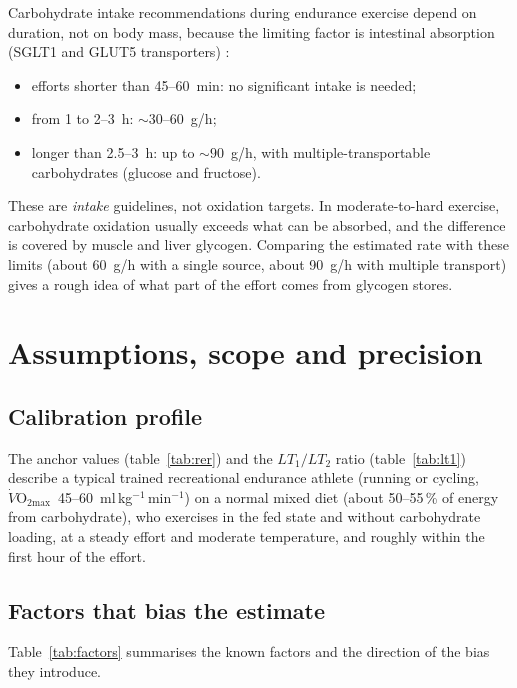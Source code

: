 \documentclass[10pt,a4paper]{article}
\newcommand{\VOmax}{\ensuremath{\dot V\mathrm{O_{2max}}}}
\newcommand{\mlkgmin}{ml\,kg$^{-1}$\,min$^{-1}$}
\begin{document}
Carbohydrate intake recommendations during endurance exercise depend on duration, not on
body mass, because the limiting factor is intestinal absorption (SGLT1 and GLUT5
transporters) \citep{jeukendrup2014}:
\begin{itemize}
  \item efforts shorter than 45--60~min: no significant intake is needed;
  \item from 1 to 2--3~h: $\sim30$--60~g/h;
  \item longer than 2.5--3~h: up to $\sim90$~g/h, with multiple-transportable
        carbohydrates (glucose and fructose).
\end{itemize}
These are \emph{intake} guidelines, not oxidation targets. In moderate-to-hard exercise,
carbohydrate oxidation usually exceeds what can be absorbed, and the difference is covered
by muscle and liver glycogen. Comparing the estimated rate with these limits (about 60~g/h
with a single source, about 90~g/h with multiple transport) gives a rough idea of what part
of the effort comes from glycogen stores.

\section{Assumptions, scope and precision}\label{sec:suposits}

\subsection{Calibration profile}
The anchor values (table~\ref{tab:rer}) and the $LT_1/LT_2$ ratio (table~\ref{tab:lt1})
describe a typical trained recreational endurance athlete (running or cycling, \VOmax\
45--60~\mlkgmin) on a normal mixed diet (about 50--55\,\% of energy from carbohydrate), who
exercises in the fed state and without carbohydrate loading, at a steady effort and moderate
temperature, and roughly within the first hour of the effort.

\subsection{Factors that bias the estimate}
Table~\ref{tab:factors} summarises the known factors and the direction of the bias they
introduce.
\end{document}
